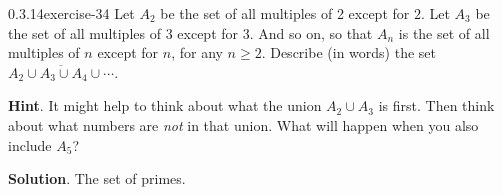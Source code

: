 \documentclass[twoside,11pt,]{book}
\numberwithin{equation}{chapter}
\renewcommand{\bar}{\overline}
\begin{document}
\begin{divisionsolution}{0.3.14}{}{exercise-34}%
\hypertarget{p-691}{}%
Let \(A_2\) be the set of all multiples of 2 except for \(2\). Let \(A_3\) be the set of all multiples of 3 except for 3. And so on, so that \(A_n\) is the set of all multiples of \(n\) except for \(n\), for any \(n \ge 2\). Describe (in words) the set \(\bar{A_2 \cup A_3 \cup A_4 \cup \cdots}\).%
\par\smallskip%
\noindent\textbf{Hint}.\quad%
\hypertarget{p-692}{}%
It might help to think about what the union \(A_2 \cup A_3\) is first.  Then think about what numbers are \emph{not} in that union.  What will happen when you also include \(A_5\)?%
\par\smallskip%
\noindent\textbf{Solution}.\quad%
\hypertarget{p-693}{}%
The set of primes.%
\end{divisionsolution}%
\end{document}
